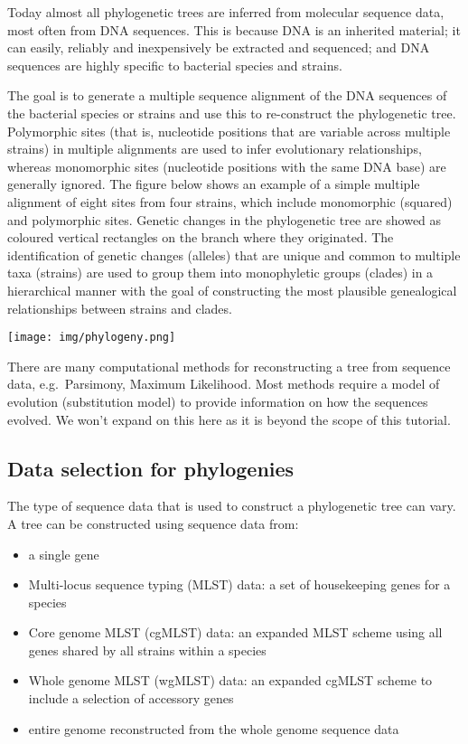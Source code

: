 \documentclass[11pt]{article}
\providecommand{\tightlist}{%
      \setlength{\itemsep}{0pt}\setlength{\parskip}{0pt}}
\begin{document}
Today almost all phylogenetic trees are inferred from molecular sequence
data, most often from DNA sequences. This is because DNA is an inherited
material; it can easily, reliably and inexpensively be extracted and
sequenced; and DNA sequences are highly specific to bacterial species
and strains.

The goal is to generate a multiple sequence alignment of the DNA
sequences of the bacterial species or strains and use this to
re-construct the phylogenetic tree. Polymorphic sites (that is,
nucleotide positions that are variable across multiple strains) in
multiple alignments are used to infer evolutionary relationships,
whereas monomorphic sites (nucleotide positions with the same DNA base)
are generally ignored. The figure below shows an example of a simple
multiple alignment of eight sites from four strains, which include
monomorphic (squared) and polymorphic sites. Genetic changes in the
phylogenetic tree are showed as coloured vertical rectangles on the
branch where they originated. The identification of genetic changes
(alleles) that are unique and common to multiple taxa (strains) are used
to group them into monophyletic groups (clades) in a hierarchical manner
with the goal of constructing the most plausible genealogical
relationships between strains and clades.


\begin{center}
\texttt{[image: img/phylogeny.png]}
\end{center}


    There are many computational methods for reconstructing a tree from
sequence data, e.g.~Parsimony, Maximum Likelihood. Most methods require
a model of evolution (substitution model) to provide information on how
the sequences evolved. We won't expand on this here as it is beyond the
scope of this tutorial.

    \hypertarget{data-selection-for-phylogenies}{%
\subsection{Data selection for
phylogenies}\label{data-selection-for-phylogenies}}

The type of sequence data that is used to construct a phylogenetic tree
can vary. A tree can be constructed using sequence data from:

\begin{itemize}
\tightlist
\item
  a single gene
\item
  Multi-locus sequence typing (MLST) data: a set of housekeeping genes
  for a species
\item
  Core genome MLST (cgMLST) data: an expanded MLST scheme using all
  genes shared by all strains within a species
\item
  Whole genome MLST (wgMLST) data: an expanded cgMLST scheme to include
  a selection of accessory genes
\item
  entire genome reconstructed from the whole genome sequence data
\end{itemize}
\end{document}
